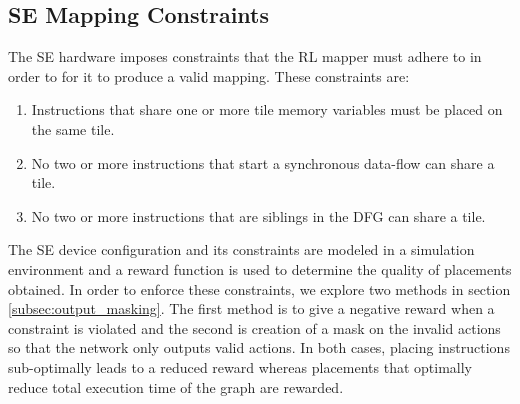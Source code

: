 \subsection{SE Mapping Constraints}
The SE hardware imposes constraints that the RL mapper must adhere to in order to for it to produce a valid mapping. These constraints are:
\begin{enumerate}
  \item Instructions that share one or more tile memory variables must be placed on the same tile.
  \item No two or more instructions that start a synchronous data-flow can share a tile.
  \item No two or more instructions that are siblings in the DFG can share a tile.
\end{enumerate}
The SE device configuration and its constraints are modeled in a simulation environment and a reward function is used to determine the quality of placements obtained.
In order to enforce these constraints, we explore two methods in section \ref{subsec:output_masking}. The first method is to give a negative reward when a 
constraint is violated and the second is creation of a mask on the invalid actions so that the network only outputs valid actions.
In both cases, placing instructions sub-optimally leads to a reduced reward whereas placements that optimally reduce total execution time of the graph are rewarded. 